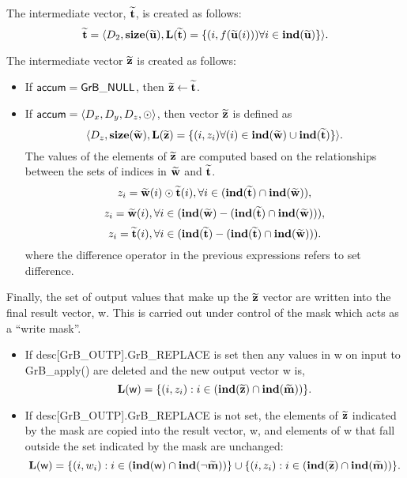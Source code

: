 The intermediate vector, ${\bf \widetilde{t}}$, is created as follows:
\[ 
{\bf \widetilde{t}} = \langle
D_2, \bold{size}({\bf \widetilde{u}}),
\bold{L}({\bf \widetilde{t}}) =
\{(i,f({\bf \widetilde{u}}(i))) \forall i \in \bold{ind}({\bf \widetilde{u}}) \} \rangle. 
\]

The intermediate vector ${\bf \widetilde{z}}$ is created as follows:
\begin{itemize}
    \item If ${\sf accum} = {\sf GrB\_NULL}$, then ${\bf \widetilde{z}} \leftarrow {\bf \widetilde{t}}$.

    \item If ${\sf accum} = \langle D_x, D_y, D_z, \odot \rangle$, then vector ${\bf \widetilde{z}}$ is defined as 
        \[ \langle D_z, \bold{size}({\bf \widetilde{w}}), \bold{L}({\bf \widetilde{z}})
		= \{(i,z_{i})  \forall (i) \in \bold{ind}({\bf \widetilde{w}}) \cup 
        \bold{ind}({\bf \widetilde{t}}) \} \rangle.\]
    The values of the elements of ${\bf \widetilde{z}}$ are computed based on the relationships between the sets of indices in ${\bf \widetilde{w}}$ and ${\bf \widetilde{t}}$.
\[
z_{i} = {\bf \widetilde{w}}(i) \odot {\bf \widetilde{t}}(i), \forall i \in  (\bold{ind}({\bf \widetilde{t}}) \cap \bold{ind}({\bf \widetilde{w}})),
\]
\[
z_{i} = {\bf \widetilde{w}}(i), \forall  i \in  (\bold{ind}({\bf \widetilde{w}}) - (\bold{ind}({\bf \widetilde{t}}) \cap \bold{ind}({\bf \widetilde{w}}))),
\]
\[
z_{i} = {\bf \widetilde{t}}(i), \forall  i \in  (\bold{ind}({\bf \widetilde{t}}) - (\bold{ind}({\bf \widetilde{t}}) \cap \bold{ind}({\bf \widetilde{w}}))).
\]
where the difference operator in the previous expressions refers to set difference.
\end{itemize}

Finally, the set of output values that make up the ${\bf \widetilde{z}}$ 
vector are written into the final result vector, {\sf w}. 
This is carried out under control of the mask which acts as a ``write mask''.
\begin{itemize}
\item If {\sf desc[GrB\_OUTP].GrB\_REPLACE} is set then any values in {\sf w} 
on input to {\sf GrB\_apply()} are deleted and the new output vector {\sf w} is,
\[ \bold{L}({\sf w}) = \{(i,z_{i}) : i \in (\bold{ind}({\bf \widetilde{z}}) 
\cap \bold{ind}({\bf \widetilde{m}})) \}. \]

\item If {\sf desc[GrB\_OUTP].GrB\_REPLACE} is not set, the elements of 
${\bf \widetilde{z}}$ indicated by 
the mask are copied into the result vector, {\sf w}, and elements of 
{\sf w} that fall outside the set indicated by the mask are unchanged:
\[ \bold{L}({\sf w}) = \{(i,w_{i}) : i \in (\bold{ind}({\sf w}) 
\cap \bold{ind}(\neg {\bf \widetilde{m}})) \} \cup \{(i,z_{i}) : i \in 
(\bold{ind}({\bf \widetilde{z}}) \cap \bold{ind}({\bf \widetilde{m}})) \}. \]
\end{itemize}

